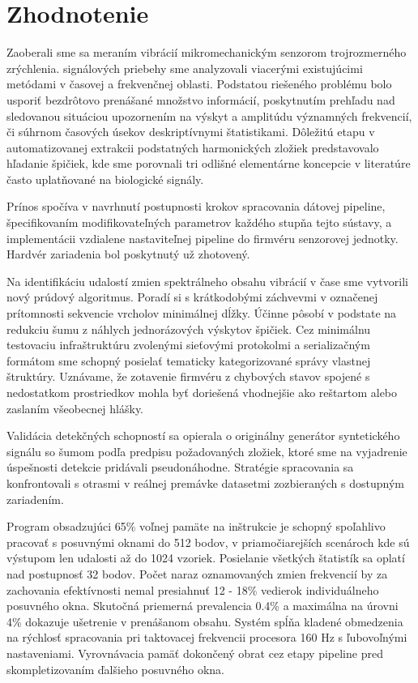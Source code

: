 \chapter{Zhodnotenie}
Zaoberali sme sa meraním vibrácií mikromechanickým senzorom trojrozmerného zrýchlenia.
signálových priebehy sme analyzovali viacerými existujúcimi metódami v časovej a frekvenčnej oblasti.
Podstatou riešeného problému bolo usporiť bezdrôtovo prenášané množstvo informácií, poskytnutím
prehľadu nad sledovanou situáciou upozornením na výskyt a amplitúdu významných frekvencií, či súhrnom
časových úsekov deskriptívnymi štatistikami. Dôležitú etapu v automatizovanej extrakcii
podstatných harmonických zložiek predstavovalo hľadanie špičiek, kde sme porovnali tri odlišné
elementárne koncepcie v literatúre často uplatňované na biologické signály.

Prínos spočíva v navrhnutí postupnosti krokov spracovania dátovej pipeline, špecifikovaním
modifikovateľných parametrov každého stupňa tejto sústavy, a implementácii vzdialene nastaviteľnej
pipeline do firmvéru senzorovej jednotky. Hardvér zariadenia bol poskytnutý už zhotovený.

Na identifikáciu udalostí zmien spektrálneho obsahu vibrácií v čase sme vytvorili nový prúdový algoritmus.
Poradí si s krátkodobými záchvevmi v označenej prítomnosti sekvencie vrcholov minimálnej dĺžky. Účinne pôsobí
v podstate na redukciu šumu z náhlych jednorázových výskytov špičiek. Cez minimálnu testovaciu infraštruktúru
zvolenými sieťovými protokolmi a serializačným formátom sme schopný posielať tematicky kategorizované správy vlastnej
štruktúry. Uznávame, že zotavenie firmvéru z chybových stavov spojené s nedostatkom prostriedkov mohla byť
doriešená vhodnejšie ako reštartom alebo zaslaním všeobecnej hlášky.

Validácia detekčných schopností sa opierala o originálny generátor syntetického signálu so šumom podľa
predpisu požadovaných zložiek, ktoré sme na vyjadrenie úspešnosti detekcie pridávali pseudonáhodne.
Stratégie spracovania sa konfrontovali s otrasmi v reálnej premávke datasetmi
zozbieraných s dostupným zariadením.

Program obsadzujúci 65\% voľnej pamäte na inštrukcie je schopný spoľahlivo pracovať s posuvnými
oknami do 512 bodov, v priamočiarejších scenároch kde sú výstupom len udalosti až do 1024 vzoriek.
Posielanie všetkých štatistík sa oplatí nad postupnosť 32 bodov. Počet naraz oznamovaných
zmien frekvencií by za zachovania efektívnosti nemal presiahnuť 12 - 18\% vedierok individuálneho posuvného
okna. Skutočná priemerná prevalencia 0.4\% a maximálna na úrovni 4\% dokazuje ušetrenie v prenášanom obsahu.
Systém spĺňa kladené obmedzenia na rýchlosť spracovania pri taktovacej frekvencii procesora 160 Hz s ľubovoľnými
nastaveniami. Vyrovnávacia pamäť dokončený obrat cez etapy pipeline pred skompletizovaním ďalšieho posuvného okna.

